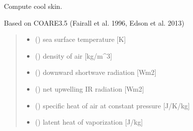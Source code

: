 \documentclass[letterpaper,10pt,english]{sphinxmanual}
\begin{document}
\begin{fulllineitems}
\label{\detokenize{users_guide:cs_wl_subs.cs_C35}}
\pysigstartsignatures
{}
\pysigstopsignatures
\sphinxAtStartPar
Compute cool skin.

\sphinxAtStartPar
Based on COARE3.5 (Fairall et al. 1996, Edson et al. 2013)
\begin{quote}\begin{description}
\begin{itemize}
\item {} 
\sphinxAtStartPar
{} () \textendash{} sea surface temperature      {[}K{]}

\item {} 
\sphinxAtStartPar
{} () \textendash{} density of air               {[}kg/m\textasciicircum{}3{]}

\item {} 
\sphinxAtStartPar
{} () \textendash{} downward shortwave radiation {[}Wm\sphinxhyphen{}2{]}

\item {} 
\sphinxAtStartPar
{} () \textendash{} net upwelling IR radiation       {[}Wm\sphinxhyphen{}2{]}

\item {} 
\sphinxAtStartPar
{} () \textendash{} specific heat of air at constant pressure {[}J/K/kg{]}

\item {} 
\sphinxAtStartPar
{} () \textendash{} latent heat of vaporization   {[}J/kg{]}


\end{itemize}
\end{description}
\end{quote}
\end{fulllineitems}
\end{document}
